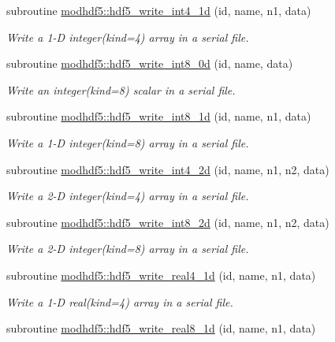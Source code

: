 \begin{DoxyCompactItemize}
subroutine \hyperlink{namespacemodhdf5_a85487dfda18b03bd8b48100b016240b3}{modhdf5\+::hdf5\+\_\+write\+\_\+int4\+\_\+1d} (id, name, n1, data)
\begin{DoxyCompactList}\small\item\em Write a 1-\/D integer(kind=4) array in a serial file. \end{DoxyCompactList}\item 
subroutine \hyperlink{namespacemodhdf5_ac1a8b8e5ce7ef658ba72dab5853a855a}{modhdf5\+::hdf5\+\_\+write\+\_\+int8\+\_\+0d} (id, name, data)
\begin{DoxyCompactList}\small\item\em Write an integer(kind=8) scalar in a serial file. \end{DoxyCompactList}\item 
subroutine \hyperlink{namespacemodhdf5_af39615b3539b84afc3890884aafec217}{modhdf5\+::hdf5\+\_\+write\+\_\+int8\+\_\+1d} (id, name, n1, data)
\begin{DoxyCompactList}\small\item\em Write a 1-\/D integer(kind=8) array in a serial file. \end{DoxyCompactList}\item 
subroutine \hyperlink{namespacemodhdf5_ab39fa5690f5f029a8beea46dd8030b1d}{modhdf5\+::hdf5\+\_\+write\+\_\+int4\+\_\+2d} (id, name, n1, n2, data)
\begin{DoxyCompactList}\small\item\em Write a 2-\/D integer(kind=4) array in a serial file. \end{DoxyCompactList}\item 
subroutine \hyperlink{namespacemodhdf5_abcc24e701a795a92f16c6d4c1eb034c7}{modhdf5\+::hdf5\+\_\+write\+\_\+int8\+\_\+2d} (id, name, n1, n2, data)
\begin{DoxyCompactList}\small\item\em Write a 2-\/D integer(kind=8) array in a serial file. \end{DoxyCompactList}\item 
subroutine \hyperlink{namespacemodhdf5_a5f075a274076e480eee835fd3b9573af}{modhdf5\+::hdf5\+\_\+write\+\_\+real4\+\_\+1d} (id, name, n1, data)
\begin{DoxyCompactList}\small\item\em Write a 1-\/D real(kind=4) array in a serial file. \end{DoxyCompactList}\item 
subroutine \hyperlink{namespacemodhdf5_aed41c10954f7cb054d46df0c012d147d}{modhdf5\+::hdf5\+\_\+write\+\_\+real8\+\_\+1d} (id, name, n1, data)

\end{DoxyCompactItemize}

